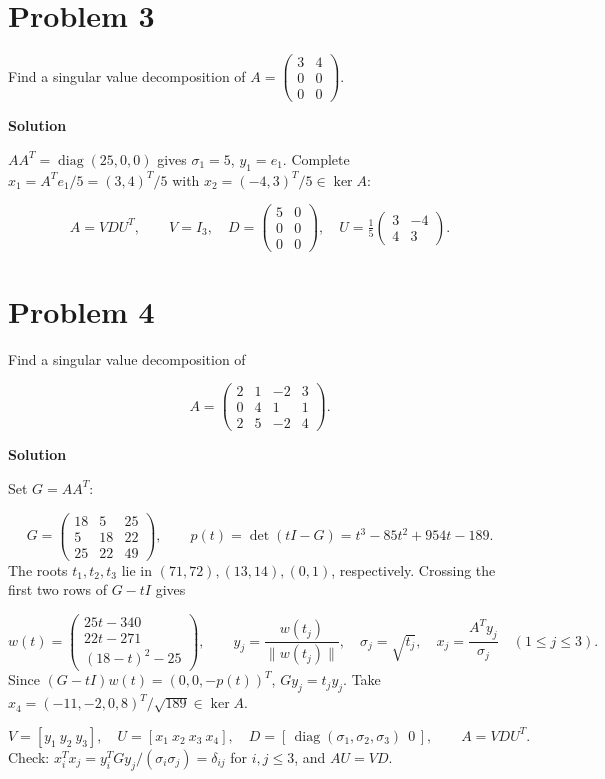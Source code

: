 \documentclass[UTF8,10pt,letterpaper,fontset=fandol]{ctexart}
\begin{document}
\section{Problem 3}
Find a singular value decomposition of $A=\left(\begin{smallmatrix}3&4\\0&0\\0&0\end{smallmatrix}\right)$.\par
\par{}\textbf{Solution}\par
$AA^T=\operatorname{diag}(25,0,0)$ gives $\sigma_1=5$, $y_1=e_1$. Complete $x_1=A^Te_1/5=(3,4)^T/5$ with $x_2=(-4,3)^T/5\in\ker A$:\par
\[
 \boxed{A=VDU^T},\qquad V=I_3,\quad
 D=\begin{pmatrix}5&0\\0&0\\0&0\end{pmatrix},\quad
 U=\tfrac15\begin{pmatrix}3&-4\\4&3\end{pmatrix}.
\]
\section{Problem 4}
Find a singular value decomposition of\par
\[
 A=\begin{pmatrix}2&1&-2&3\\0&4&1&1\\2&5&-2&4\end{pmatrix}.
\]
\par{}\textbf{Solution}\par
Set $G=AA^T$:\par
\[
G=\begin{pmatrix}18&5&25\\5&18&22\\25&22&49\end{pmatrix},
\qquad p(t)=\det(tI-G)=t^3-85t^2+954t-189 .
\]
The roots $t_1,t_2,t_3$ lie in $(71,72),(13,14),(0,1)$, respectively. Crossing the first two rows of $G-tI$ gives\par
\[
 w(t)=\begin{pmatrix}25t-340\\22t-271\\(18-t)^2-25\end{pmatrix},\qquad
 y_j=\frac{w(t_j)}{\|w(t_j)\|},\quad
 \sigma_j=\sqrt{t_j},\quad x_j=\frac{A^Ty_j}{\sigma_j}\quad(1\le j\le3).
\]
Since $(G-tI)w(t)=(0,0,-p(t))^T$, $Gy_j=t_jy_j$. Take $x_4=(-11,-2,0,8)^T/\sqrt{189}\in\ker A$.\par
\[
 V=[y_1\ y_2\ y_3],\quad U=[x_1\ x_2\ x_3\ x_4],\quad
 D=[\,\operatorname{diag}(\sigma_1,\sigma_2,\sigma_3)\ \ 0\,],\qquad \boxed{A=VDU^T}.
\]
Check: $x_i^Tx_j=y_i^TGy_j/(\sigma_i\sigma_j)=\delta_{ij}$ for $i,j\le3$, and $AU=VD$.\par
\newpage
\end{document}
